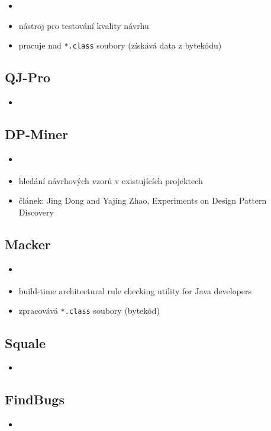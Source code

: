 \begin{itemize}
\item \cite{existingtools:jdepend}
\item nástroj pro testování kvality návrhu
\item pracuje nad \verb+*.class+ soubory (získává data z bytekódu)
\end{itemize}

\subsection{QJ-Pro}
\begin{itemize}
\item \cite{existingtools:qjpro}
\end{itemize}

\subsection{DP-Miner}
\begin{itemize}
\item \cite{existingtools:dp-miner}
\item hledání návrhových vzorů v existujících projektech
\item článek: Jing Dong and Yajing Zhao, Experiments on Design Pattern Discovery \cite{4273268}
\end{itemize}

\subsection{Macker}
\begin{itemize}
\item \cite{existingtools:macker}
\item build-time architectural rule checking utility for Java developers
\item zpracovává \verb+*.class+ soubory (bytekód)
\end{itemize}

\subsection{Squale}
\begin{itemize}
\item \cite{existingtools:squale}
\end{itemize}

\subsection{FindBugs}
\begin{itemize}
\item \cite{existingtools:findbugs}
\end{itemize}

